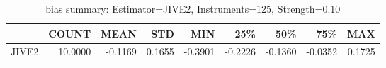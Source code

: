 \begin{table}[ht]
\centering
\caption{bias summary: Estimator=JIVE2, Instruments=125, Strength=0.10}
\begin{tabular}{lrrrrrrrr}
\toprule
 & COUNT & MEAN & STD & MIN & 25\% & 50\% & 75\% & MAX \\
\midrule
JIVE2 & 10.0000 & -0.1169 & 0.1655 & -0.3901 & -0.2226 & -0.1360 & -0.0352 & 0.1725 \\
\bottomrule
\end{tabular}
\end{table}

